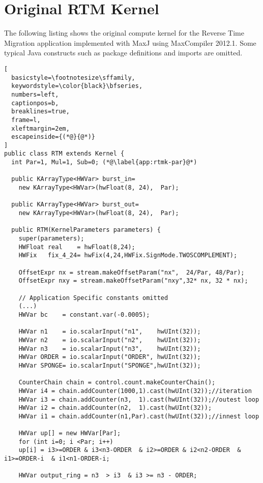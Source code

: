 \chapter{Original RTM Kernel}
\label{app:rtm-kernel}
The following listing shows the original compute kernel for the
Reverse Time Migration application implemented with MaxJ using
MaxCompiler 2012.1. Some typical Java constructs such as package
definitions and imports are omitted.

\begin{lstlisting}[
  basicstyle=\footnotesize\sffamily,
  keywordstyle=\color{black}\bfseries,
  numbers=left,
  captionpos=b,
  breaklines=true,
  frame=l,
  xleftmargin=2em,
  escapeinside={(*@}{@*)}
]
public class RTM extends Kernel {
  int Par=1, Mul=1, Sub=0; (*@\label{app:rtmk-par}@*)

  public KArrayType<HWVar> burst_in=
    new KArrayType<HWVar>(hwFloat(8, 24),  Par);

  public KArrayType<HWVar> burst_out=
    new KArrayType<HWVar>(hwFloat(8, 24),  Par);

  public RTM(KernelParameters parameters) {
    super(parameters);
    HWFloat real    = hwFloat(8,24);
    HWFix   fix_4_24= hwFix(4,24,HWFix.SignMode.TWOSCOMPLEMENT);

    OffsetExpr nx = stream.makeOffsetParam("nx",  24/Par, 48/Par);
    OffsetExpr nxy = stream.makeOffsetParam("nxy",32* nx, 32 * nx);

    // Application Specific constants omitted
    (...)
    HWVar bc    = constant.var(-0.0005);

    HWVar n1    = io.scalarInput("n1",    hwUInt(32));
    HWVar n2    = io.scalarInput("n2",    hwUInt(32));
    HWVar n3    = io.scalarInput("n3",    hwUInt(32));
    HWVar ORDER = io.scalarInput("ORDER", hwUInt(32));
    HWVar SPONGE= io.scalarInput("SPONGE",hwUInt(32));

    CounterChain chain = control.count.makeCounterChain();
    HWVar i4 = chain.addCounter(1000,1).cast(hwUInt(32));//iteration
    HWVar i3 = chain.addCounter(n3,  1).cast(hwUInt(32));//outest loop
    HWVar i2 = chain.addCounter(n2,  1).cast(hwUInt(32));
    HWVar i1 = chain.addCounter(n1,Par).cast(hwUInt(32));//innest loop

    HWVar up[] = new HWVar[Par];
    for (int i=0; i <Par; i++)
    up[i] = i3>=ORDER & i3<n3-ORDER  & i2>=ORDER & i2<n2-ORDER  & i1>=ORDER-i  & i1<n1-ORDER-i;

    HWVar output_ring = n3  > i3  & i3 >= n3 - ORDER;


\end{lstlisting}
